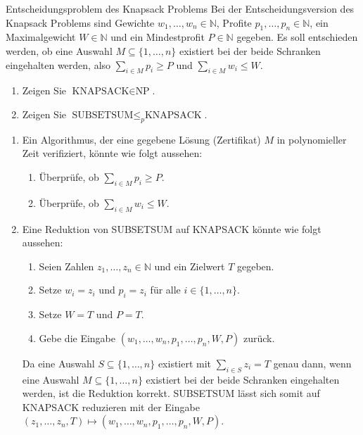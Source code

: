 \documentclass{article}
\begin{document}
\begin{exercise}{Entscheidungsproblem des Knapsack Problems}
  Bei der Entscheidungsversion des Knapsack Problems sind Gewichte $w_1, \ldots, w_n \in \mathbb{N}$, Profite $p_1, \ldots, p_n \in \mathbb{N}$, ein Maximalgewicht $W \in \mathbb{N}$ und ein Mindestprofit $P \in \mathbb{N}$ gegeben. Es soll entschieden werden, ob eine Auswahl $M \subseteq \{1, \ldots, n\}$ existiert bei der beide Schranken eingehalten werden, also $\sum_{i \in M} p_i \geq P$ und $\sum_{i \in M} w_i \leq W$.
  \begin{enumerate}
    \item Zeigen Sie $\text{KNAPSACK} \in \text{NP}$.
    \item Zeigen Sie $\text{SUBSETSUM} \leq_p \text{KNAPSACK}$.
  \end{enumerate}

  \begin{solution}
    \begin{enumerate}
      \item Ein Algorithmus, der eine gegebene Lösung (Zertifikat) $M$ in polynomieller Zeit verifiziert, könnte wie folgt aussehen:
            \begin{enumerate}
              \item Überprüfe, ob $\sum_{i \in M} p_i \geq P$.
              \item Überprüfe, ob $\sum_{i \in M} w_i \leq W$.
            \end{enumerate}
      \item Eine Reduktion von SUBSETSUM auf KNAPSACK könnte wie folgt aussehen:
            \begin{enumerate}
              \item Seien Zahlen $z_1, \ldots, z_n \in \mathbb{N}$ und ein Zielwert $T$ gegeben.
              \item Setze $w_i = z_i$ und $p_i = z_i$ für alle $i \in \{1, \ldots, n\}$.
              \item Setze $W = T$ und $P = T$.
              \item Gebe die Eingabe $(w_1, \ldots, w_n, p_1, \ldots, p_n, W, P)$ zurück.
            \end{enumerate}
            Da eine Auswahl $S \subseteq \{1, \ldots, n\}$ existiert mit $\sum_{i \in S} z_i = T$ genau dann, wenn eine Auswahl $M \subseteq \{1, \ldots, n\}$ existiert bei der beide Schranken eingehalten werden, ist die Reduktion korrekt. SUBSETSUM lässt sich somit auf KNAPSACK reduzieren mit der Eingabe $(z_1, \ldots, z_n, T) \mapsto (w_1, \ldots, w_n, p_1, \ldots, p_n, W, P)$.
    \end{enumerate}
  \end{solution}
\end{exercise}
\end{document}
